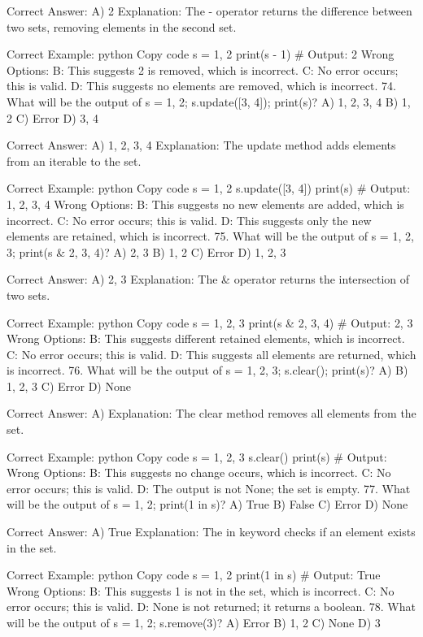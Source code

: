 Correct Answer: A) {2}
Explanation: The - operator returns the difference between two sets, removing elements in the second set.

Correct Example:
python
Copy code
s = {1, 2}
print(s - {1})  # Output: {2}
Wrong Options:
B: This suggests 2 is removed, which is incorrect.
C: No error occurs; this is valid.
D: This suggests no elements are removed, which is incorrect.
74. What will be the output of s = {1, 2}; s.update([3, 4]); print(s)?
A) {1, 2, 3, 4}
B) {1, 2}
C) Error
D) {3, 4}

Correct Answer: A) {1, 2, 3, 4}
Explanation: The update method adds elements from an iterable to the set.

Correct Example:
python
Copy code
s = {1, 2}
s.update([3, 4])
print(s)  # Output: {1, 2, 3, 4}
Wrong Options:
B: This suggests no new elements are added, which is incorrect.
C: No error occurs; this is valid.
D: This suggests only the new elements are retained, which is incorrect.
75. What will be the output of s = {1, 2, 3}; print(s & {2, 3, 4})?
A) {2, 3}
B) {1, 2}
C) Error
D) {1, 2, 3}

Correct Answer: A) {2, 3}
Explanation: The & operator returns the intersection of two sets.

Correct Example:
python
Copy code
s = {1, 2, 3}
print(s & {2, 3, 4})  # Output: {2, 3}
Wrong Options:
B: This suggests different retained elements, which is incorrect.
C: No error occurs; this is valid.
D: This suggests all elements are returned, which is incorrect.
76. What will be the output of s = {1, 2, 3}; s.clear(); print(s)?
A) {}
B) {1, 2, 3}
C) Error
D) None

Correct Answer: A) {}
Explanation: The clear method removes all elements from the set.

Correct Example:
python
Copy code
s = {1, 2, 3}
s.clear()
print(s)  # Output: {}
Wrong Options:
B: This suggests no change occurs, which is incorrect.
C: No error occurs; this is valid.
D: The output is not None; the set is empty.
77. What will be the output of s = {1, 2}; print(1 in s)?
A) True
B) False
C) Error
D) None

Correct Answer: A) True
Explanation: The in keyword checks if an element exists in the set.

Correct Example:
python
Copy code
s = {1, 2}
print(1 in s)  # Output: True
Wrong Options:
B: This suggests 1 is not in the set, which is incorrect.
C: No error occurs; this is valid.
D: None is not returned; it returns a boolean.
78. What will be the output of s = {1, 2}; s.remove(3)?
A) Error
B) {1, 2}
C) None
D) {3}


